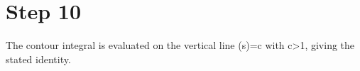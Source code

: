 \section*{Step 10}

The contour integral is evaluated on the vertical line \Re(s)=c with c>1, giving the stated identity.
